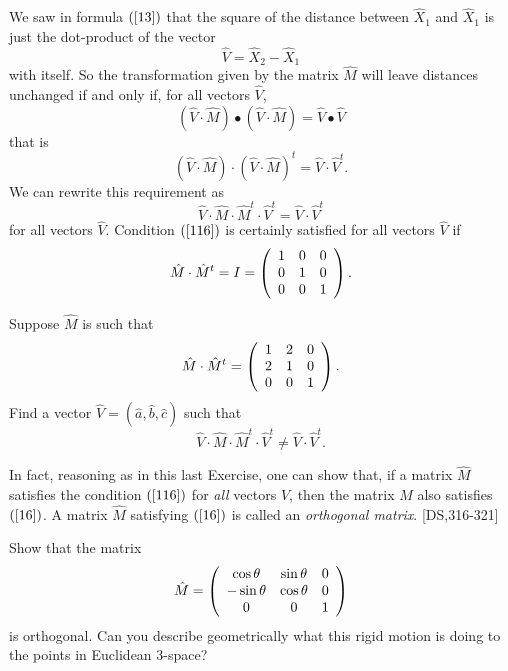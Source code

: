 We saw in formula $\left(  \ref{13}\right)  $ that the square of the distance
between $\hat{X}_{1}$ and $\hat{X}_{1}$ is just the dot-product of the vector%
\[
\hat{V}=\hat{X}_{2}-\hat{X}_{1}%
\]
with itself. So the transformation given by the matrix $\hat{M}$ will leave
distances unchanged if and only if, for all vectors $\hat{V}$,%
\[
\left(  \hat{V}  \cdot\hat{M}\right)  \bullet\left(
\hat{V}  \cdot\hat{M}\right)  =\hat{V}\bullet\hat{V}%
\]
that is%
\[
\left( \hat{V}  \cdot\hat{M}\right)  \cdot\left(
\hat{V}  \cdot\hat{M}\right)  ^{t}=\hat{V}  \cdot
\hat{V}  ^{t}.
\]
We can rewrite this requirement as%
\begin{equation}
\hat{V}  \cdot\hat{M}\cdot\hat{M}^{t}\cdot  \hat
{V}  ^{t}=\hat{V}  \cdot\hat{V}  ^{t}
\label{116}%
\end{equation}
for all vectors $\hat{V}$. Condition $\left(  \ref{116}\right)  $ is certainly
satisfied for all vectors $\hat{V}$ if
\begin{equation}
\hat{M}\cdot\hat{M}^{t}=I=\left(
\begin{array}
[c]{ccc}%
1 & 0 & 0\\
0 & 1 & 0\\
0 & 0 & 1
\end{array}
\right)  . \label{16}%
\end{equation}


\begin{exercise}
Suppose $\hat{M}$ is such that%
\[
\hat{M}\cdot\hat{M}^{t}=\left(
\begin{array}
[c]{ccc}%
1 & 2 & 0\\
2 & 1 & 0\\
0 & 0 & 1
\end{array}
\right)  .
\]
Find a vector $\hat{V}=\left(  \hat{a},\hat{b},\hat{c}\right)  $ such that%
\[
\hat{V} \cdot\hat{M}\cdot\hat{M}^{t}\cdot\hat{V}  ^{t}\neq\hat{V}  \cdot\hat{V}
^{t}.
\]

\end{exercise}

In fact, reasoning as in this last Exercise, one can show that, if a matrix
$\hat{M}$ satisfies the condition $\left(  \ref{116}\right)  $ for
\textit{all} vectors $\hat{V}$, then the matrix $\hat{M}$ also satisfies
$\left(  \ref{16}\right)  $. A matrix $\hat{M}$ satisfying $\left(
\ref{16}\right)  $ is called an \textit{orthogonal matrix}. [DS,316-321]

\begin{exercise}
\label{14} Show that the matrix%
\[
\hat{M}=\left(
\begin{array}
[c]{ccc}%
\cos\theta & \sin\theta & 0\\
-\sin\theta & \cos\theta & 0\\
0 & 0 & 1
\end{array}
\right)
\]
is orthogonal. Can you describe geometrically what this rigid motion is doing
to the points in Euclidean $3$-space?
\end{exercise}

